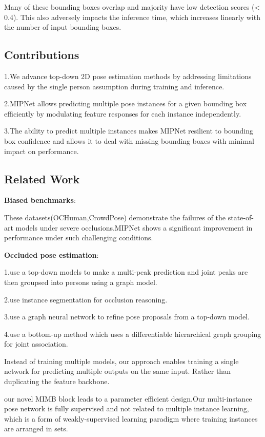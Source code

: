 \documentclass[11pt]{article}
\begin{document}
Many of these bounding boxes overlap and majority have low detection scores (< 0.4). This also adversely impacts the inference time, which increases linearly with
the number of input bounding boxes.

\subsection{Contributions}

1.We advance top-down 2D pose estimation methods by addressing limitations caused by the single person assumption during training and inference.

2.MIPNet allows predicting multiple pose instances for a given bounding box efficiently by modulating feature responses for each instance independently.

3.The ability to predict multiple instances makes MIPNet resilient to bounding box confidence and allows it to deal with missing bounding boxes with minimal impact on performance.

\subsection{Related Work}

\textbf{Biased benchmarks}:

These datasets(OCHuman,CrowdPose) demonstrate the failures of the state-of-art models under severe occlusions.MIPNet shows a significant improvement in performance under such challenging conditions.

\textbf{Occluded pose estimation}:

1.use a top-down models to make a multi-peak prediction and joint peaks are then groupsed into persons using a graph model.

2.use instance segmentation for occlusion reasoning.

3.use a graph neural network to refine pose proposals from a top-down model.

4.use a bottom-up method which uses a differentiable hierarchical graph grouping for joint association.

Instead of training multiple models, our approach enables training a single network for predicting multiple outputs on the same input. Rather than duplicating the feature backbone.

our novel MIMB block leads to a parameter efficient design.Our multi-instance pose network is fully supervised and not related to multiple instance learning, which is a form of weakly-supervised learning paradigm where training instances are arranged in sets.
\end{document}
